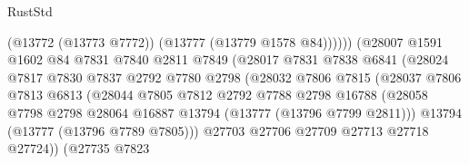\begin{lexlean}{RustStd}
\begin{coremodule}
                                          (@13772 (@13773 @7772))
                                          (@13777 (@13779 @1578 @84))))))
                                  (@28007
                                    @1591
                                    @1602
                                    @84
                                    @7831
                                    @7840
                                    @2811
                                    @7849
                                    (@28017
                                      @7831
                                      @7838
                                      @6841
                                      (@28024
                                        @7817
                                        @7830
                                        @7837
                                        @2792
                                        @7780
                                        @2798
                                        (@28032
                                          @7806
                                          @7815
                                          (@28037
                                            @7806
                                            @7813
                                            @6813
                                            (@28044
                                              @7805
                                              @7812
                                              @2792
                                              @7788
                                              @2798
                                              @16788
                                              (@28058
                                                @7798
                                                @2798
                                                @28064
                                                @16887
                                                @13794
                                                (@13777 (@13796 @7799 @2811)))
                                              @13794
                                              (@13777 (@13796 @7789 @7805)))
                                            @27703
                                            @27706
                                            @27709
                                            @27713
                                            @27718
                                            @27724))
                                        (@27735
                                          @7823

\end{coremodule}
\end{lexlean}
